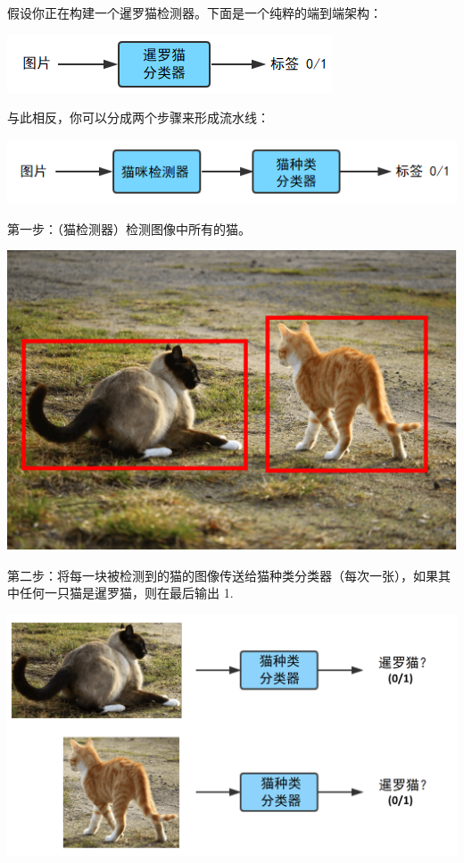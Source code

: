 假设你正在构建一个暹罗猫检测器。下面是一个纯粹的端到端架构：

\includegraphics{./img/ch51_02.png}

与此相反，你可以分成两个步骤来形成流水线：

\includegraphics{./img/ch51_04.png}

第一步：（猫检测器）检测图像中所有的猫。

\includegraphics{./img/ch51_05.png}

第二步：将每一块被检测到的猫的图像传送给猫种类分类器（每次一张），如果其中任何一只猫是暹罗猫，则在最后输出
1.

\includegraphics{./img/ch51_06.png}

